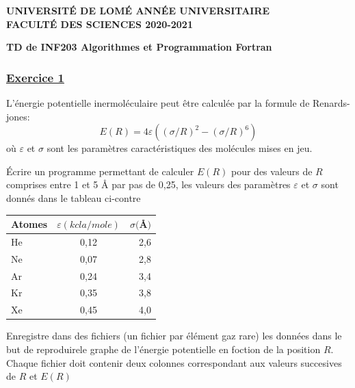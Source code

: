 \documentclass[a4paper, 11pt]{report}
\begin{document}
\noindent
{\bf UNIVERSITÉ DE LOMÉ \hfill ANNÉE UNIVERSITAIRE \\
FACULTÉ DES SCIENCES \hfill 2020-2021 }

\begin{center}
  {\bf TD de INF203 Algorithmes et Programmation Fortran}
\end{center}

\subsubsection{\underline{Exercice 1}}

\noindent
L'énergie potentielle inermoléculaire peut être calculée par la formule de Renards-jones: 
$$ E(R) = 4\varepsilon((\sigma/R)^2 - (\sigma/R)^6) $$
où $\varepsilon$ et $\sigma$ sont les paramètres caractéristiques des molécules mises en jeu. \\

\vspace{0,25cm}
\noindent
\begin{minipage}{0.6\textwidth}

\noindent
Écrire un programme permettant de calculer $E(R)$ pour des valeurs de $R$ comprises entre 1 et 5 \AA \hspace{0,05 cm} par pas de 0,25, les valeurs des paramètres $\varepsilon$ et $\sigma$ sont donnés dans le tableau ci-contre 
\end{minipage}
\begin{minipage}{0.4\textwidth}
  \begin{tabular}{||l c r||}
    \hline
    \hline
    Atomes & $\varepsilon(kcla/mole)$ & $\sigma($\AA$)$ \\
    \hline
    \hline
    He & 0,12 & 2,6 \\
    Ne & 0,07 & 2,8 \\
    Ar & 0,24 & 3,4 \\ 
    Kr & 0,35 & 3,8 \\
    Xe & 0,45 & 4,0 \\
    \hline
    \hline
  \end{tabular}
\end{minipage}

\noindent
Enregistre dans des fichiers (un fichier par élément gaz rare) les données dans le but de reproduirele graphe de l'énergie potentielle en foction de la position $R$. \\
Chaque fichier doit contenir deux colonnes correspondant aux valeurs succesives de $R$ et $E(R)$
\end{document}
